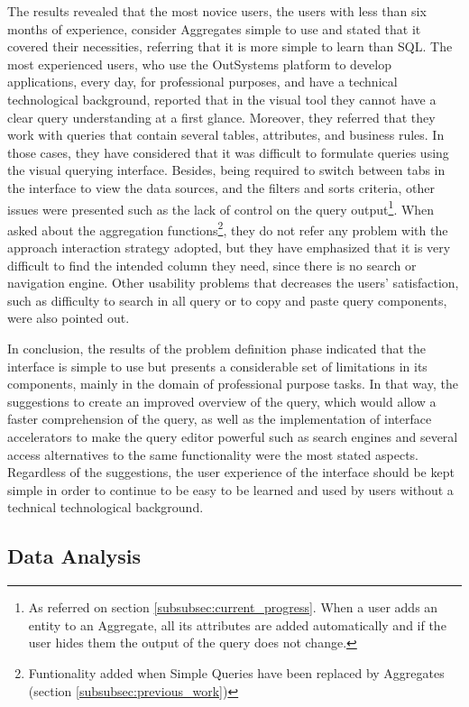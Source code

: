 The results revealed that the most novice users, the users with less than six months of experience, consider Aggregates simple to use and stated that it covered their necessities, referring that it is more simple to learn than \gls{SQL}. The most experienced users, who use the OutSystems platform to develop applications, every day, for professional purposes, and have a technical technological background, reported that in the visual tool they cannot have a clear query understanding at a first glance. Moreover, they referred that they work with queries that contain several tables, attributes, and business rules. In those cases, they have considered that it was difficult to formulate queries using the visual querying interface. Besides, being required to switch between tabs in the interface to view the data sources, and the filters and sorts criteria, other issues were presented such as the lack of control on the query output\footnote{As referred on section \ref{subsubsec:current_progress}. When a user adds an entity to an Aggregate, all its attributes are added automatically and if the user hides them the output of the query does not change.}. When asked about the aggregation functions\footnote{Funtionality added when Simple Queries have been replaced by Aggregates (section \ref{subsubsec:previous_work})}, they do not refer any problem with the approach interaction strategy adopted, but they have emphasized that it is very difficult to find the intended column they need, since there is no search or navigation engine. Other usability problems that decreases the users’ satisfaction, such as difficulty to search in all query or to copy and paste query components, were also pointed out.

In conclusion, the results of the problem definition phase indicated that the interface is simple to use but presents a considerable set of limitations in its components, mainly in the domain of professional purpose tasks. In that way, the suggestions to create an improved overview of the query, which would allow a faster comprehension of the query, as well as the implementation of interface accelerators to make the query editor powerful such as search engines and several access alternatives to the same functionality were the most stated aspects. Regardless of the suggestions, the user experience of the interface should be kept simple in order to continue to be easy to be learned and used by users without a technical technological background.

\subsection{Data Analysis}
\label{subsec:data_analysis}

